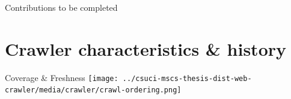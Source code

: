 \documentclass[9pt]{beamer}
\begin{document}

\begin{frame}{Contributions}
  to be completed
\end{frame}


\section[Crawler history]{Crawler characteristics \& history}
\begin{frame}[plain]
\end{frame}


\begin{frame}{Coverage \& Freshness}
  \centering
  \texttt{[image: ../csuci-mscs-thesis-dist-web-crawler/media/crawler/crawl-ordering.png]}
\end{frame}

\end{document}
